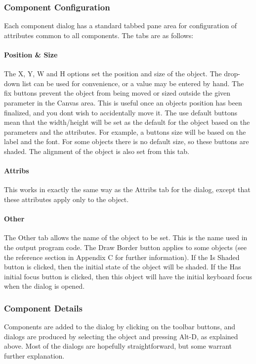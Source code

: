 \subsubsection{Component Configuration}
Each component dialog has a standard tabbed pane area for configuration
of attributes common to all components. The tabs are as follows:

\paragraph{Position \& Size}
The X, Y, W and H options set the position and size of the object. The
drop-down list can be used for convenience, or a value may be entered
by hand. The {\textquotedbl}fix{\textquotedbl} buttons prevent the
object from being moved or sized outside the given parameter in the
Canvas area. This is useful once an object{\textquotesingle}s position
has been finalized, and you don{\textquotesingle}t wish to accidentally
move it. The {\textquotedbl}use default{\textquotedbl} buttons mean
that the width/height will be set as the default for the object based
on the parameters and the attributes. For example, a
button{\textquotesingle}s size will be based on the label and the font.
For some objects there is no default size, so these buttons are shaded.
The alignment of the object is also set from this tab.

\paragraph{Attribs}
This works in exactly the same way as the Attribs tab for the dialog,
except that these attributes apply only to the object.

\paragraph{Other}
The Other tab allows the name of the object to be set. This is the name
used in the output program code. The {\textquotedbl}Draw
Border{\textquotedbl} button applies to some objects (see the reference
section in Appendix C for further information). If the
{\textquotedbl}Is Shaded{\textquotedbl} button is clicked, then the
initial state of the object will be shaded. If the {\textquotedbl}Has
initial focus{\textquotedbl} button is clicked, then this object will
have the initial keyboard focus when the dialog is
opened.

\subsubsection[Component Details]{Component Details}
Components are added to the dialog by clicking on the toolbar buttons,
and dialogs are produced by selecting the object and pressing Alt-D, as
explained above. Most of the dialogs are hopefully straightforward, but
some warrant further explanation.

